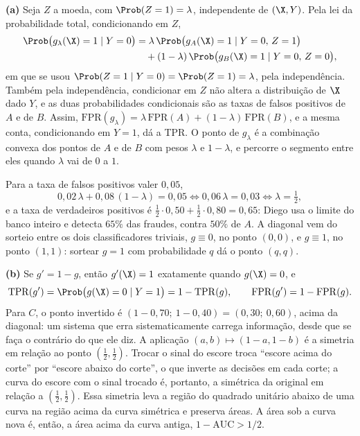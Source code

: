 \begin{solucao}
\textbf{(a)} Seja $Z$ a moeda, com $\Prob(Z=1)=\lambda$, independente de $(\X,Y)$. Pela lei
da probabilidade total, condicionando em $Z$,
\begin{align*}
  \Prob\big(g_\lambda(\X)=1\mid Y=0\big)
  &=\lambda\,\Prob\big(g_A(\X)=1\mid Y=0,\,Z=1\big)\\
  &\quad+(1-\lambda)\,\Prob\big(g_B(\X)=1\mid Y=0,\,Z=0\big),
\end{align*}
em que se usou $\Prob(Z=1\mid Y=0)=\Prob(Z=1)=\lambda$, pela independência. Também pela
independência, condicionar em $Z$ não altera a distribuição de $\X$ dado $Y$, e as duas
probabilidades condicionais são as taxas de falsos positivos de $A$ e de $B$. Assim,
$\mathrm{FPR}(g_\lambda)=\lambda\,\mathrm{FPR}(A)+(1-\lambda)\,\mathrm{FPR}(B)$, e a mesma
conta, condicionando em $Y=1$, dá a TPR. O ponto de $g_\lambda$ é a combinação convexa dos
pontos de $A$ e de $B$ com pesos $\lambda$ e $1-\lambda$, e percorre o segmento entre eles
quando $\lambda$ vai de $0$ a $1$.

Para a taxa de falsos positivos valer $0{,}05$,
\[
  0{,}02\,\lambda+0{,}08\,(1-\lambda)=0{,}05\iff 0{,}06\,\lambda=0{,}03\iff\lambda=\tfrac12 ,
\]
e a taxa de verdadeiros positivos é $\tfrac12\cdot0{,}50+\tfrac12\cdot0{,}80=0{,}65$: Diego usa
o limite do banco inteiro e detecta $65\%$ das fraudes, contra $50\%$ de $A$. A diagonal
vem do sorteio entre os dois classificadores triviais, $g\equiv0$, no ponto $(0,0)$, e
$g\equiv1$, no ponto $(1,1)$: sortear $g=1$ com probabilidade $q$ dá o ponto $(q,q)$.

\smallskip
\textbf{(b)} Se $g'=1-g$, então $g'(\X)=1$ exatamente quando $g(\X)=0$, e
\[
  \mathrm{TPR}(g')=\Prob\big(g(\X)=0\mid Y=1\big)=1-\mathrm{TPR}(g),
  \qquad
  \mathrm{FPR}(g')=1-\mathrm{FPR}(g).
\]
Para $C$, o ponto invertido é $(1-0{,}70;\ 1-0{,}40)=(0{,}30;\ 0{,}60)$, acima da diagonal: um
sistema que erra sistematicamente carrega informação, desde que se faça o contrário do que
ele diz. A aplicação $(a,b)\mapsto(1-a,1-b)$ é a simetria em relação ao ponto
$(\tfrac12,\tfrac12)$. Trocar o sinal do escore troca ``escore acima do corte'' por
``escore abaixo do corte'', o que inverte as decisões em cada corte; a curva do escore com o
sinal trocado é, portanto, a simétrica da original em relação a $(\tfrac12,\tfrac12)$. Essa
simetria leva a região do quadrado unitário abaixo de uma curva na região acima da curva
simétrica e preserva áreas. A área sob a curva nova é, então, a área acima da curva antiga,
$1-\mathrm{AUC}>1/2$.


\end{solucao}
